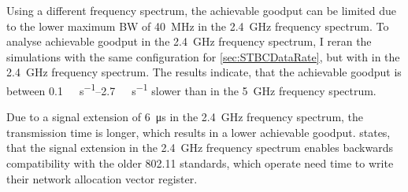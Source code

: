 Using a different frequency spectrum, the achievable goodput can be limited due to the lower maximum \ac{BW} of \SI{40}{\mega\hertz} in the \SI{2.4}{\giga\hertz} frequency spectrum.
To analyse achievable goodput in the \SI{2.4}{\giga\hertz} frequency spectrum, I reran the simulations with the same configuration for \autoref{sec:STBCDataRate}, but with in the \SI{2.4}{\giga\hertz} frequency spectrum.
The results indicate, that the achievable goodput is between \SIrange{0.1}{2.7}{\mega\bit\per\second} slower than in the \SI{5}{\giga\hertz} frequency spectrum.

Due to a signal extension of \SI{6}{\micro\second} in the \SI{2.4}{\giga\hertz} frequency spectrum, the transmission time is longer, which results in a lower achievable goodput.
\cite{noauthor_ieee_2021} states, that the signal extension in the \SI{2.4}{\giga\hertz} frequency spectrum enables
backwards compatibility with the older \ac{802.11} standards, which operate need time to write their network allocation vector register.

